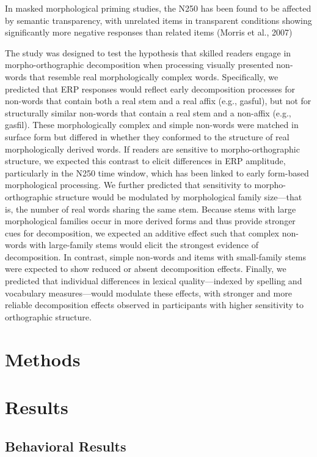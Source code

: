 \documentclass[preprint,12pt, authoryear, review]{elsarticle}
\begin{document}
In masked morphological priming studies, the N250 has been found to be affected by semantic transparency, with unrelated items in transparent conditions showing significantly more negative responses than related items (Morris et al., 2007) 

The study was designed to test the hypothesis that skilled readers engage in morpho-orthographic decomposition when processing visually presented non-words that resemble real morphologically complex words. Specifically, we predicted that ERP responses would reflect early decomposition processes for non-words that contain both a real stem and a real affix (e.g., gasful), but not for structurally similar non-words that contain a real stem and a non-affix (e.g., gasfil). These morphologically complex and simple non-words were matched in surface form but differed in whether they conformed to the structure of real morphologically derived words. If readers are sensitive to morpho-orthographic structure, we expected this contrast to elicit differences in ERP amplitude, particularly in the N250 time window, which has been linked to early form-based morphological processing. We further predicted that sensitivity to morpho-orthographic structure would be modulated by morphological family size—that is, the number of real words sharing the same stem. Because stems with large morphological families occur in more derived forms and thus provide stronger cues for decomposition, we expected an additive effect such that complex non-words with large-family stems would elicit the strongest evidence of decomposition. In contrast, simple non-words and items with small-family stems were expected to show reduced or absent decomposition effects. Finally, we predicted that individual differences in lexical quality—indexed by spelling and vocabulary measures—would modulate these effects, with stronger and more reliable decomposition effects observed in participants with higher sensitivity to orthographic structure.

\section{Methods}


\section{Results}

\subsection{Behavioral Results}
\end{document}
